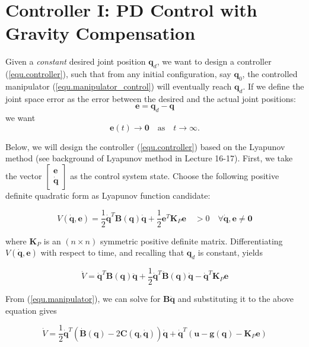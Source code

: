 \documentclass[10pt]{article}
\begin{document}
\section{Controller I: PD Control with Gravity Compensation}


Given a \emph{constant} desired joint position  $\boldsymbol{q}_{d}$, we want to design a controller (\ref{equ.controller}), such that  from  any initial configuration, say $\boldsymbol{q}_0$, the controlled manipulator (\ref{equ.manipulator_control}) will eventually reach $\boldsymbol{q}_{d}$. If we define the joint space error as  the error between the desired and the actual joint positions:
\begin{equation}
    {\boldsymbol{e}}=\boldsymbol{q}_{d}-\boldsymbol{q}
\end{equation}
we want 
$$
\boldsymbol{e}(t)\rightarrow \boldsymbol{0}\quad \text{as}\quad
t\rightarrow \infty.
$$

Below, we will design the controller (\ref{equ.controller}) based on the Lyapunov method (see  background of Lyapunov method in Lecture 16-17). First, we take the vector $\begin{bmatrix}\boldsymbol{e}\\
\boldsymbol{\dot{q}}\end{bmatrix}$  as the control system state. Choose the following positive definite quadratic form as Lyapunov function candidate:

$$
V(\dot{\boldsymbol{q}}, {\boldsymbol{e}})=\frac{1}{2} \dot{\boldsymbol{q}}^{T} \boldsymbol{B}(\boldsymbol{q}) \dot{\boldsymbol{q}}+\frac{1}{2} {\boldsymbol{e}}^{T} \boldsymbol{K}_{P} {\boldsymbol{e}} \quad >0 \quad \forall \dot{\boldsymbol{q}}, {\boldsymbol{e}} \neq \mathbf{0}
$$

where $\boldsymbol{K}_{P}$ is an $(n \times n)$ symmetric positive definite matrix. 
Differentiating  $V(\dot{\boldsymbol{q}}, {\boldsymbol{e}})$ with respect to time, and recalling that $\boldsymbol{q}_{d}$ is constant, yields

$$
\dot{V}=\dot{\boldsymbol{q}}^{T} \boldsymbol{B}(\boldsymbol{q}) \ddot{\boldsymbol{q}}+\frac{1}{2} \dot{\boldsymbol{q}}^{T} \dot{\boldsymbol{B}}(\boldsymbol{q}) \dot{\boldsymbol{q}}-\dot{\boldsymbol{q}}^{T} \boldsymbol{K}_{P} {\boldsymbol{e}}
$$

From (\ref{equ.manipulator}), we can solve for $\boldsymbol{B} \ddot{\boldsymbol{q}}$ and substituting it to the above equation gives


\begin{equation}
    \label{equ.lypuanovdot}
    \dot{V}=\frac{1}{2} \dot{\boldsymbol{q}}^{T}(\dot{\boldsymbol{B}}(\boldsymbol{q})-2 \boldsymbol{C}(\boldsymbol{q}, \dot{\boldsymbol{q}})) \dot{\boldsymbol{q}}+\dot{\boldsymbol{q}}^{T}\left(\boldsymbol{u}-\boldsymbol{g}(\boldsymbol{q})-\boldsymbol{K}_{P} {\boldsymbol{e}}\right)
\end{equation}
\end{document}
